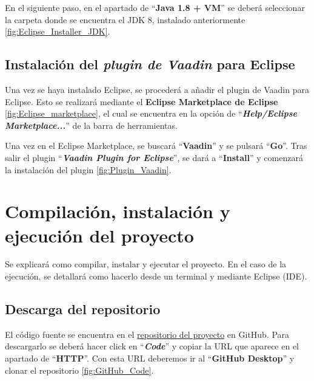 En el siguiente paso, en el apartado de ``\textbf{Java 1.8 + VM}'' se deberá seleccionar la carpeta donde se encuentra el JDK 8, instalado anteriormente \ref{fig:Eclipse_Installer_JDK}.


\subsection{Instalación del \textit{plugin de Vaadin} para Eclipse}
Una vez se haya instalado Eclipse, se procederá a añadir el plugin de Vaadin para Eclipse. Esto se realizará mediante el \textbf{Eclipse Marketplace de Eclipse} \ref{fig:Eclipse_marketplace}, el cual se encuentra en la opción de ``\textbf{\textit{Help/Eclipse Marketplace...}}'' de la barra de herramientas.


Una vez en el Eclipse Marketplace, se buscará ``\textbf{Vaadin}'' y se pulsará ``\textbf{Go}''. Tras salir el plugin ``\textbf{\textit{Vaadin Plugin for Eclipse}}'', se dará a ``\textbf{Install}'' y comenzará la instalación del plugin \ref{fig:Plugin_Vaadin}.


\section{Compilación, instalación y ejecución del proyecto}
Se explicará como compilar, instalar y ejecutar el proyecto. En el caso de la ejecución, se detallará como hacerlo desde un terminal y mediante Eclipse (IDE).

\subsection{Descarga del repositorio}
El código fuente se encuentra en el \href{https://github.com/dbo1001/Gestor-TFG-2021}{repositorio del proyecto} en GitHub. Para descargarlo se deberá hacer click en ``\textbf{\textit{Code}}'' y copiar la URL que aparece en el apartado de ``\textbf{HTTP}''. Con esta URL deberemos ir al ``\textbf{GitHub Desktop}'' y clonar el repositorio \ref{fig:GitHub_Code}.


